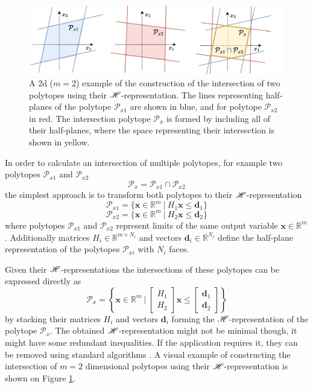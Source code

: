 \begin{figure}[!h]
    \centering
    \includegraphics[width=0.8\linewidth]{Chapters/imgs/polytope_intersection.pdf}
    \caption{A 2d ($m\!=\!2$) example of the construction of the intersection of two polytopes using their $\mathscr{H}$-representation. The lines representing half-planes of the polytope $\mathcal{P}_{x1}$ are shown in blue, and for polytope $\mathcal{P}_{x2}$ in red. The intersection polytope $\mathcal{P}_x$ is formed by including all of their half-planes, where the space representing their intersection is shown in yellow.}
    \label{fig:collab_intesection_solution}
\end{figure}

In order to calculate an intersection of multiple polytopes, for example two polytopes $\mathcal{P}_{x1}$ and $ \mathcal{P}_{x2}$
\begin{equation}
    \mathcal{P}_x = \mathcal{P}_{x1} \cap \mathcal{P}_{x2}
\end{equation}
the simplest approach is to transform both polytopes to their $\mathscr{H}$-representation
\begin{equation}
    \mathcal{P}_{x1} = \{\bm{x}\in\mathbb{R}^m ~|~ H_1\bm{x}\leq \bm{d}_1\}
\end{equation}
\begin{equation}
    \mathcal{P}_{x2} = \{\bm{x}\in\mathbb{R}^m ~|~ H_2\bm{x}\leq \bm{d}_2\}
\end{equation}
where polytopes $\mathcal{P}_{x1}$ and  $\mathcal{P}_{x2}$ represent limits of the same output variable $\bm{x}\in\mathbb{R}^m$. Additionally matrices $H_i\in\mathbb{R}^{m\times N_i}$ and vectors $\bm{d}_i\in\mathbb{R}^{N_i}$ define the half-plane representation of the polytopes $\mathcal{P}_{xi}$ with $N_i$ faces.

Given their $\mathscr{H}$-representations the intersections of these polytopes can be expressed directly as
\begin{equation}
    \mathcal{P}_x = \left\{\bm{x}\in\mathbb{R}^m ~\bigg|~ \begin{bmatrix}
        H_1\\
        H_2
    \end{bmatrix}\bm{x}\leq \begin{bmatrix}
        \bm{d}_1\\
        \bm{d}_2
    \end{bmatrix}\right\}
\end{equation}
by stacking their matrices $H_i$ and vectors $\bm{d}_i$ forming the $\mathscr{H}$-representation of the polytope $\mathcal{P}_x$. The obtained $\mathscr{H}$-representation might not be minimal though, it might have some redundant inequalities. If the application requires it, they can be removed using standard algorithms \cite{Paulraj2006}.
A visual example of constructing the intersection of $m=2$ dimensional polytopes using their $\mathscr{H}$-representation is shown on Figure \ref{fig:collab_intesection_solution}.

